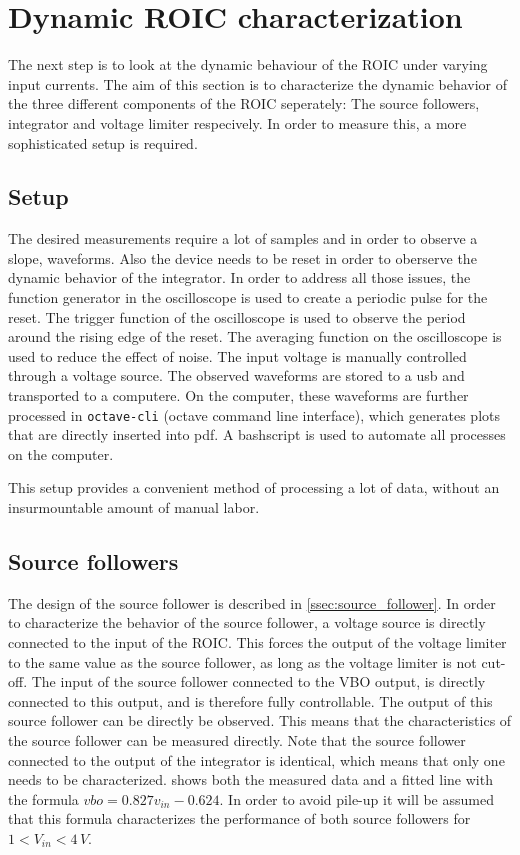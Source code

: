 \section{Dynamic ROIC characterization}\label{sec:dynamic_ROIC_characterization}
The next step is to look at the dynamic behaviour of the ROIC under varying input currents. The aim of this section is to characterize the dynamic behavior of the three different components of the ROIC seperately: The source followers, integrator and voltage limiter respecively. In order to measure this, a more sophisticated setup is required.


\subsection{Setup}\label{ssec:dynamic_setup}
The desired measurements require a lot of samples and in order to observe a slope, waveforms. Also the device needs to be reset in order to oberserve the dynamic behavior of the integrator. In order to address all those issues, the function generator in the oscilloscope is used to create a periodic pulse for the reset. The trigger function of the oscilloscope is used to observe the period around the rising edge of the reset. The averaging function on the oscilloscope is used to reduce the effect of noise. The input voltage is manually controlled through a voltage source. The observed waveforms are stored to a usb and transported to a computere. On the computer, these waveforms are further processed in \texttt{octave-cli} (octave command line interface), which generates plots that are directly inserted into pdf. A bashscript is used to automate all processes on the computer.

This setup provides a convenient method of processing a lot of data, without an insurmountable amount of manual labor.

\subsection{Source followers}\label{ssec:dynamic_source_followers}
The design of the source follower is described in \cref{ssec:source_follower}. In order to characterize the behavior of the source follower, a voltage source is directly connected to the input of the ROIC. This forces the output of the voltage limiter to the same value as the source follower, as long as the voltage limiter is not cut-off. The input of the source follower connected to the VBO output, is directly connected to this output, and is therefore fully controllable. The output of this source follower can be directly be observed. This means that the characteristics of the source follower can be measured directly. Note that the source follower connected to the output of the integrator is identical, which means that only one needs to be characterized.  shows both the measured data and a fitted line with the formula $vbo=0.827v_{in}-0.624$. In order to avoid pile-up it will be assumed that this formula characterizes the performance of both source followers for $1<V_{in}<4\,V$.

